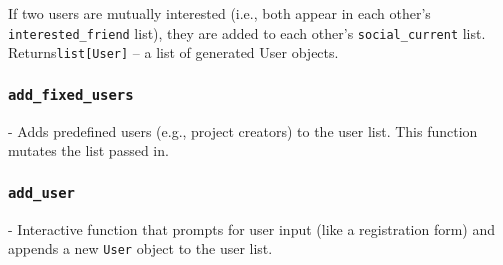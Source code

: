 \documentclass[fontsize=11pt]{article}
\begin{document}
If two users are mutually interested (i.e., both appear in each other's \texttt{interested\_friend} list), they are added to each other's \texttt{social\_current} list. Returns\texttt{list[User]} – a list of generated User objects.

\subsubsection*{\texttt{add\_fixed\_users}}
- Adds predefined users (e.g., project creators) to the user list. This function mutates the list passed in.

\subsubsection*{\texttt{add\_user}}
- Interactive function that prompts for user input (like a registration form) and appends a new \texttt{User} object to the user list.
\end{document}
